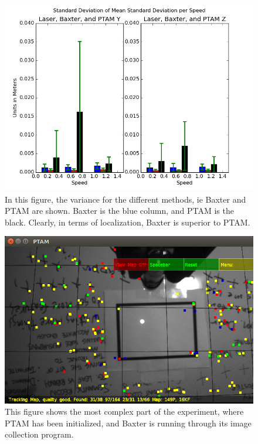 \documentclass[12pt]{report}
\begin{document}
\begin{figure}[!ht]
	\centering
	\includegraphics[scale=0.55]{bax_and_ptam_std_dev.png}
	\caption{In this figure, the variance for the different methods, ie Baxter and PTAM are shown. Baxter is the blue column, and PTAM is the black. Clearly, in terms of localization, Baxter is superior to PTAM.}
	\label{fig:bax_ptam_std_dev}
\end{figure}

\begin{figure}[!ht]
	\centering
	\includegraphics[scale=0.55]{experiment_image.png}
	\caption{This figure shows the most complex part of the experiment, where PTAM has been initialized, and Baxter is running through its image collection program.}
	\label{fig:experiment_image}
\end{figure}
\end{document}

